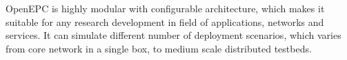 \documentclass[english]{tktltiki2}
\theoremstyle{definition}
\theoremstyle{remark}
\begin{document}
OpenEPC is highly modular with configurable architecture, which makes it suitable for any research development in field of applications, networks and services. It can simulate different number of deployment scenarios, which varies from core network in a single box, to medium scale distributed testbeds. 


\clearpage



%
%
% 
%


% 





% 
\end{document}
